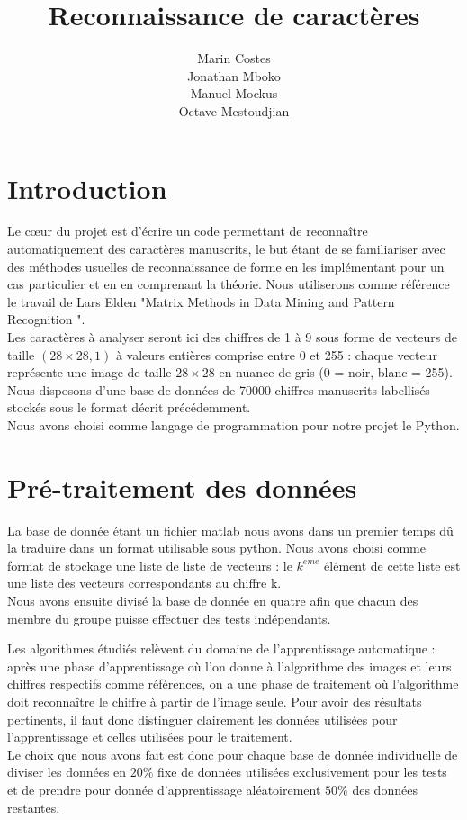 \documentclass[a4paper,11pt,twoside]{report}
\author{Marin Costes\\Jonathan Mboko\\Manuel Mockus\\Octave Mestoudjian}
\title{Reconnaissance de caractères}
\begin{document}
 
\maketitle 

\tableofcontents
\chapter{Introduction}
Le cœur du projet est d'écrire un code permettant de reconnaître automatiquement des caractères manuscrits, le but étant de se familiariser avec des méthodes usuelles de reconnaissance de forme en les implémentant pour un cas particulier et en en comprenant la théorie. 
Nous utiliserons comme référence le travail de Lars Elden "Matrix Methods in Data Mining and Pattern Recognition  \cite{Elden:1}". \\

Les caractères à analyser seront ici des chiffres de 1 à 9 sous forme de vecteurs de taille $(28\times28,1)$ à valeurs entières comprise entre 0 et 255 : chaque vecteur représente une image de taille $28\times28$ en nuance de gris (0 = noir, blanc = 255). Nous disposons d'une base de données de 70000 chiffres manuscrits labellisés stockés sous le format décrit précédemment.\\
 
Nous avons choisi comme langage de programmation pour notre projet le Python.

\chapter{Pré-traitement des données}
La base de donnée étant un fichier matlab nous avons dans un premier temps dû la traduire dans un format utilisable sous python. Nous avons choisi comme format de stockage une liste de liste de vecteurs : le $k^{eme}$ élément de cette liste est une liste des vecteurs correspondants au chiffre k.\\
Nous avons ensuite divisé la base de donnée en quatre afin que chacun des membre du groupe puisse effectuer des tests indépendants. 

Les algorithmes étudiés relèvent du domaine de l'apprentissage automatique : après une phase d'apprentissage où l'on donne à l'algorithme des images et leurs chiffres respectifs comme références, on a une phase de traitement où l'algorithme doit reconnaître le chiffre à partir de l'image seule. Pour avoir des résultats pertinents, il faut donc distinguer clairement les données utilisées pour l'apprentissage et celles utilisées pour le traitement.\\Le choix que nous avons fait est donc pour chaque base de donnée individuelle de diviser les données en $20\%$ fixe de données utilisées exclusivement pour les tests et de prendre pour donnée d'apprentissage aléatoirement $50\%$ des données restantes.
\end{document}
